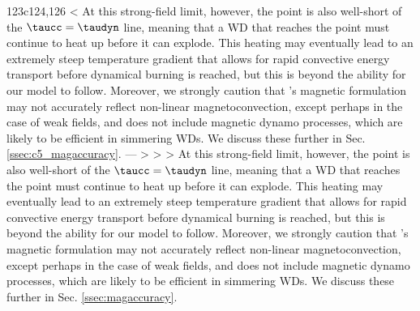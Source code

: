 123c124,126
< At this strong-field limit, however, the \citeal{wooswk04} point is also well-short of the $\taucc = \taudyn$ line, meaning that a WD that reaches the point must continue to heat up before it can explode.  This heating may eventually lead to an extremely steep temperature gradient that allows for rapid convective energy transport before dynamical burning is reached, but this is beyond the ability for our model to follow.  Moreover, we strongly caution that \citeal{stev79}'s magnetic formulation may not accurately reflect non-linear magnetoconvection, except perhaps in the case of weak fields, and does not include magnetic dynamo processes, which are likely to be efficient in simmering WDs.  We discuss these further in Sec. \ref{ssec:c5_magaccuracy}.
---
> %
> 
> At this strong-field limit, however, the \citeal{wooswk04} point is also well-short of the $\taucc = \taudyn$ line, meaning that a WD that reaches the point must continue to heat up before it can explode.  This heating may eventually lead to an extremely steep temperature gradient that allows for rapid convective energy transport before dynamical burning is reached, but this is beyond the ability for our model to follow.  Moreover, we strongly caution that \citeal{stev79}'s magnetic formulation may not accurately reflect non-linear magnetoconvection, except perhaps in the case of weak fields, and does not include magnetic dynamo processes, which are likely to be efficient in simmering WDs.  We discuss these further in Sec. \ref{ssec:magaccuracy}.
